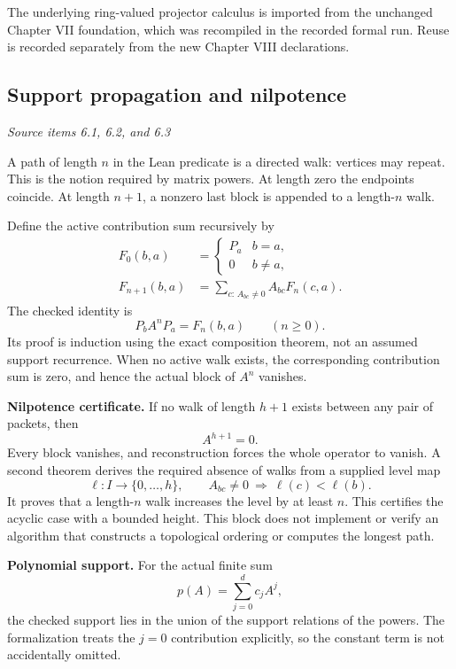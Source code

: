 The underlying ring-valued projector calculus is imported from the unchanged Chapter VII foundation, which was recompiled in the recorded formal run. Reuse is recorded separately from the new Chapter VIII declarations.



\subsection{Support propagation and nilpotence}\label{supp1:subsection:002}\textit{Source items 6.1, 6.2, and 6.3}\par
A path of length $n$ in the Lean predicate  is a directed walk: vertices may repeat. This is the notion required by matrix powers. At length zero the endpoints coincide. At length $n+1$, a nonzero last block is appended to a length-$n$ walk.

Define the active contribution sum recursively by
\begin{align*}
F_0(b,a)&=\begin{cases}P_a&b=a,\\0&b\ne a,\end{cases}\\
F_{n+1}(b,a)&=\sum_{c:\,A_{bc}\ne0}A_{bc}F_n(c,a).
\end{align*}
The checked identity is
\[
\boxed{P_bA^nP_a=F_n(b,a)\qquad(n\ge0).}
\]
Its proof is induction using the exact composition theorem, not an assumed support recurrence. When no active walk exists, the corresponding contribution sum is zero, and hence the actual block of $A^n$ vanishes.

\textbf{Nilpotence certificate.} If no walk of length $h+1$ exists between any pair of packets, then
\[
\boxed{A^{h+1}=0.}
\]
Every block vanishes, and reconstruction forces the whole operator to vanish. A second theorem derives the required absence of walks from a supplied level map
\[
\ell:I\longrightarrow\{0,\ldots,h\},\qquad
A_{bc}\ne0\ \Longrightarrow\ \ell(c)<\ell(b).
\]
It proves that a length-$n$ walk increases the level by at least $n$. This certifies the acyclic case with a bounded height. This block does not implement or verify an algorithm that constructs a topological ordering or computes the longest path.

\textbf{Polynomial support.} For the actual finite sum
\[
p(A)=\sum_{j=0}^{d}c_jA^j,
\]
the checked support lies in the union of the support relations of the powers. The formalization treats the $j=0$ contribution explicitly, so the constant term is not accidentally omitted.

